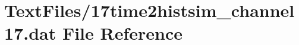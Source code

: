 \hypertarget{17time2histsim__channel17_8dat}{}\section{Text\+Files/17time2histsim\+\_\+channel17.dat File Reference}
\label{17time2histsim__channel17_8dat}
